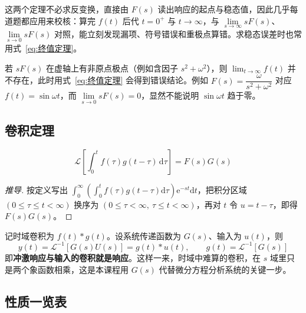 \begin{tipbox}[省力的两把尺子]
这两个定理不必求反变换，直接由 $F(s)$ 读出响应的起点与稳态值，因此几乎每道题都应用来校核：算完 $f(t)$ 后代 $t=0^{+}$ 与 $t\to\infty$，与 $\lim\limits_{s\to\infty}sF(s)$、$\lim\limits_{s\to0}sF(s)$ 对照，能立刻发现漏项、符号错误和重极点算错。求稳态误差时也常用式~\eqref{eq:终值定理}。
\end{tipbox}

\begin{warnbox}[终值定理的条件不能省]
若 $sF(s)$ 在虚轴上有非原点极点（例如含因子 $s^{2}+\omega^{2}$），则 $\lim_{t\to\infty}f(t)$ 并不存在，此时用式~\eqref{eq:终值定理} 会得到错误结论。例如 $F(s)=\dfrac{\omega}{s^{2}+\omega^{2}}$ 对应 $f(t)=\sin\omega t$，而 $\lim\limits_{s\to0}sF(s)=0$，显然不能说明 $\sin\omega t$ 趋于零。
\end{warnbox}

\subsection{卷积定理}

\begin{property}[卷积定理]
\begin{equation}
\mathcal{L}\left[\int_{0}^{t}f(\tau)g(t-\tau)\,\mathrm{d}\tau\right]=F(s)G(s)
\label{eq:卷积定理}
\end{equation}
\end{property}

\begin{proof}[推导]
按定义写出 $\int_{0}^{\infty}\!\left(\int_{0}^{t}f(\tau)g(t-\tau)\mathrm{d}\tau\right)\mathrm{e}^{-st}\mathrm{d}t$，把积分区域 $(0\le\tau\le t<\infty)$ 换序为 $(0\le\tau<\infty,\ \tau\le t<\infty)$，再对 $t$ 令 $u=t-\tau$，即得 $F(s)G(s)$。
\end{proof}

\begin{keybox}[卷积定理的用处]
记时域卷积为 $f(t)*g(t)$。设系统传递函数为 $G(s)$、输入为 $u(t)$，则
\[
y(t)=\mathcal{L}^{-1}\left[G(s)U(s)\right]=g(t)*u(t),\qquad g(t)=\mathcal{L}^{-1}\left[G(s)\right]
\]
即\textbf{冲激响应与输入的卷积就是响应}。这样一来，时域中难算的卷积，在 $s$ 域里只是两个象函数相乘，这是本课程用 $G(s)$ 代替微分方程分析系统的关键一步。
\end{keybox}

\subsection{性质一览表}

